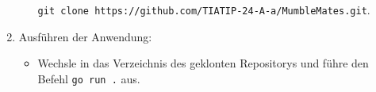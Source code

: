 \begin{enumerate}
\begin{itemize}
        \texttt{git clone https://github.com/TIATIP-24-A-a/MumbleMates.git}.
    \end{itemize}
    
    \item Ausführen der Anwendung:
    \begin{itemize}
        \item Wechsle in das Verzeichnis des geklonten Repositorys und führe den Befehl \texttt{go run .} aus.
    \end{itemize}
\end{enumerate}

\newpage





